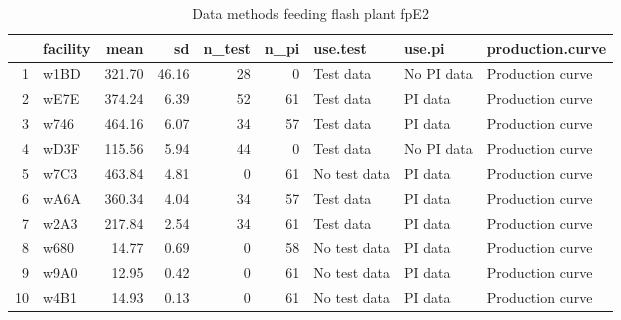 \begin{table}[H]
\centering
\begin{tabular}{rlrrrrlll}
  \hline
 & facility & mean & sd & n\_test & n\_pi & use.test & use.pi & production.curve \\ 
  \hline
1 & w1BD & 321.70 & 46.16 &  28 &   0 & Test data & No PI data & Production curve \\ 
  2 & wE7E & 374.24 & 6.39 &  52 &  61 & Test data & PI data & Production curve \\ 
  3 & w746 & 464.16 & 6.07 &  34 &  57 & Test data & PI data & Production curve \\ 
  4 & wD3F & 115.56 & 5.94 &  44 &   0 & Test data & No PI data & Production curve \\ 
  5 & w7C3 & 463.84 & 4.81 &   0 &  61 & No test data & PI data & Production curve \\ 
  6 & wA6A & 360.34 & 4.04 &  34 &  57 & Test data & PI data & Production curve \\ 
  7 & w2A3 & 217.84 & 2.54 &  34 &  61 & Test data & PI data & Production curve \\ 
  8 & w680 & 14.77 & 0.69 &   0 &  58 & No test data & PI data & Production curve \\ 
  9 & w9A0 & 12.95 & 0.42 &   0 &  61 & No test data & PI data & Production curve \\ 
  10 & w4B1 & 14.93 & 0.13 &   0 &  61 & No test data & PI data & Production curve \\ 
   \hline
\end{tabular}
\caption{Data methods feeding flash plant fpE2} 
\label{tab:well_summaries_fp14}
\end{table}
